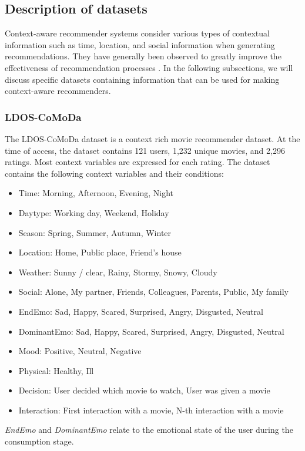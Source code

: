 \subsection{Description of datasets}\label{subsec:desc-of-datasets}
Context-aware recommender systems consider various types of contextual information such as time, location, and social information when generating recommendations.
They have generally been observed to greatly improve the effectiveness of recommendation processes \cite{aggarwal2016recommender}.
In the following subsections, we will discuss specific datasets containing information that can be used for making context-aware recommenders.

\subsubsection{LDOS-CoMoDa}
The LDOS-CoMoDa dataset is a context rich movie recommender dataset\cite{comoda}.
At the time of access, the dataset contains 121 users, 1,232 unique movies, and 2,296 ratings.
Most context variables are expressed for each rating.
The dataset contains the following context variables and their conditions:
\begin{itemize}
    \item Time: Morning, Afternoon, Evening, Night
    \item Daytype: Working day, Weekend, Holiday
    \item Season: Spring, Summer, Autumn, Winter
    \item Location:  Home, Public place, Friend's house
    \item Weather: Sunny / clear, Rainy, Stormy, Snowy, Cloudy
    \item Social: Alone, My partner, Friends, Colleagues, Parents, Public, My family
    \item EndEmo: Sad, Happy, Scared, Surprised, Angry, Disgusted, Neutral
    \item DominantEmo: Sad, Happy, Scared, Surprised, Angry, Disgusted, Neutral
    \item Mood: Positive, Neutral, Negative
    \item Physical: Healthy, Ill
    \item Decision: User decided which movie to watch, User was given a movie
    \item Interaction: First interaction with a movie, N-th interaction with a movie
\end{itemize}
\textit{EndEmo} and \textit{DominantEmo} relate to the emotional state of the user during the consumption stage.
